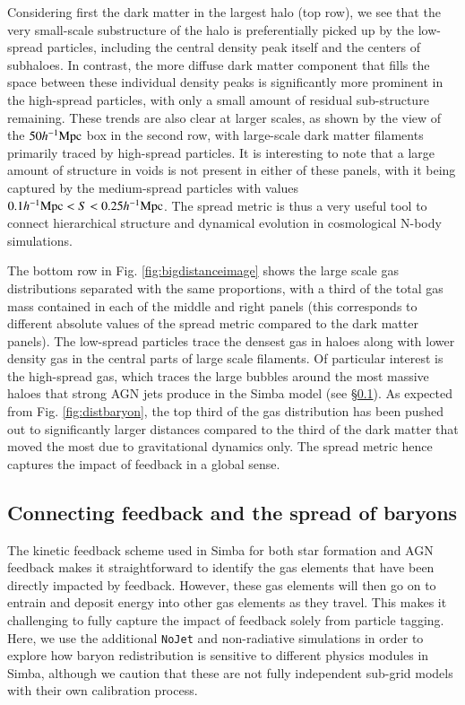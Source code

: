 \documentclass[fleqn,usenatbib]{mnras}
\newcommand{\hmpc}{h^{-1}{\rm Mpc}}
\newcommand{\simba}{{\sc Simba}}
\newcommand{\nojet}{{\tt NoJet}}
\begin{document}
Considering first the dark matter in the largest halo (top row), we see that
the very small-scale substructure of the halo is preferentially picked up by
the low-spread particles, including the central density peak itself and the
centers of subhaloes. In contrast, the more diffuse dark matter component that
fills the space between these individual density peaks is significantly more
prominent in the high-spread particles, with only a small amount of residual
sub-structure remaining. These trends are also clear at larger scales, as
shown by the view of the $50\hmpc{}$ box in the second row, with large-scale
dark matter filaments primarily traced by high-spread particles. It is
interesting to note that a large amount of structure in voids is not present
in either of these panels, with it being captured by the medium-spread
particles with values $0.1\hmpc{} < S < 0.25 \hmpc{}$. The spread
metric is thus a very useful tool to connect hierarchical structure and
dynamical evolution in cosmological N-body simulations.

The bottom row in Fig. \ref{fig:bigdistanceimage} shows the large scale gas
distributions separated with the same proportions, with a third of the total
gas mass contained in each of the middle and right panels (this corresponds
to different absolute values of the spread metric compared to the dark matter
panels). The low-spread particles trace the densest gas in haloes along with
lower density gas in the central parts of large scale filaments. Of
particular interest is the high-spread gas, which traces the large bubbles
around the most massive haloes that strong AGN jets produce in the \simba{}
model (see \S \ref{sec:fullmodelfeedback}). As expected from Fig.
\ref{fig:distbaryon}, the top third of the gas distribution has been pushed out
to significantly larger distances compared to the third of the dark matter that
moved the most due to gravitational dynamics only. The spread metric hence 
captures the impact of feedback in a global sense.

\subsection{Connecting feedback and the spread of baryons}
\label{sec:fullmodelfeedback}

The kinetic feedback scheme used in \simba{} for both star formation and AGN
feedback makes it straightforward to identify the gas elements that have been
directly impacted by feedback. However, these gas elements will then go on to
entrain and deposit energy into other gas elements as they travel. This makes
it challenging to fully capture the impact of feedback solely from particle
tagging. Here, we use the additional \nojet{} and non-radiative simulations
in order to explore how baryon redistribution is sensitive to different
physics modules in \simba{}, although we caution that these are not fully
independent sub-grid models with their own calibration process.
\end{document}
